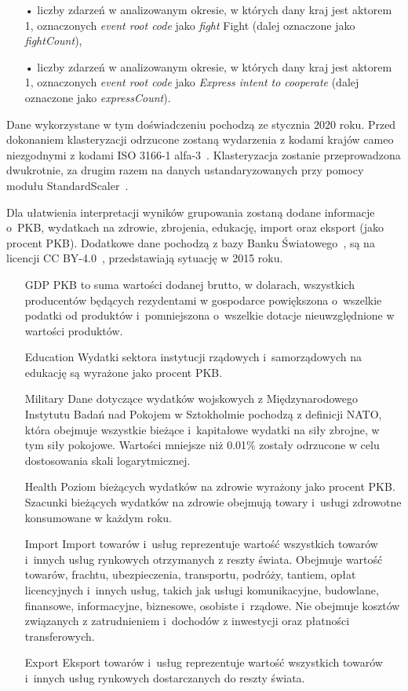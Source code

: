 \documentclass[11pt]{report}
\begin{document}
\begin{enumerate}
        \item[•] liczby zdarzeń w analizowanym okresie, w których dany kraj jest aktorem 1, oznaczonych \textit{event root code} jako \textit{fight} Fight (dalej oznaczone jako \textit{fightCount}),
        \item[•] liczby zdarzeń w analizowanym okresie, w których dany kraj jest aktorem 1, oznaczonych \textit{event root code} jako \textit{Express intent to cooperate}  (dalej oznaczone jako \textit{expressCount}).
    \end{enumerate}
    Dane wykorzystane w tym doświadczeniu pochodzą ze stycznia 2020 roku.
    Przed dokonaniem klasteryzacji odrzucone zostaną wydarzenia z kodami krajów cameo niezgodnymi z kodami ISO 3166-1 alfa-3~\cite{iso_alfa3}.
    Klasteryzacja zostanie przeprowadzona dwukrotnie, za drugim razem na danych ustandaryzowanych przy pomocy modułu StandardScaler~\cite{standardScaler}.

    Dla ułatwienia interpretacji wyników grupowania zostaną dodane informacje o~PKB, wydatkach na zdrowie, zbrojenia, edukację, import oraz eksport (jako procent PKB).
    Dodatkowe dane pochodzą z bazy Banku Światowego~\cite{worldbank}, są na licencji CC BY-4.0~\cite{wblicense}, przedstawiają sytuację w 2015 roku.
    \begin{enumerate}
        \item[GDP] PKB to suma wartości dodanej brutto, w dolarach, wszystkich producentów będących rezydentami w gospodarce powiększona o~wszelkie podatki od produktów i~pomniejszona o~wszelkie dotacje nieuwzględnione w wartości produktów.
        \item[Education] Wydatki sektora instytucji rządowych i~samorządowych na edukację są wyrażone jako procent PKB.
        \item[Military] Dane dotyczące wydatków wojskowych z Międzynarodowego Instytutu Badań nad Pokojem w Sztokholmie pochodzą z definicji NATO, która obejmuje wszystkie bieżące i~kapitałowe wydatki na siły zbrojne, w tym siły pokojowe.
        Wartości mniejsze niż 0.01\% zostały odrzucone w celu dostosowania skali logarytmicznej.
        \item[Health] Poziom bieżących wydatków na zdrowie wyrażony jako procent PKB. Szacunki bieżących wydatków na zdrowie obejmują towary i~usługi zdrowotne konsumowane w każdym roku.
        \item[Import] Import towarów i~usług reprezentuje wartość wszystkich towarów i~innych usług rynkowych otrzymanych z reszty świata.
        Obejmuje wartość towarów, frachtu, ubezpieczenia, transportu, podróży, tantiem, opłat licencyjnych i~innych usług, takich jak usługi komunikacyjne, budowlane, finansowe, informacyjne, biznesowe, osobiste i~rządowe.
        Nie obejmuje kosztów związanych z zatrudnieniem i~dochodów z inwestycji oraz płatności transferowych.
        \item[Export] Eksport towarów i~usług reprezentuje wartość wszystkich towarów i~innych usług rynkowych dostarczanych do reszty świata.
    \end{enumerate}
\end{document}
